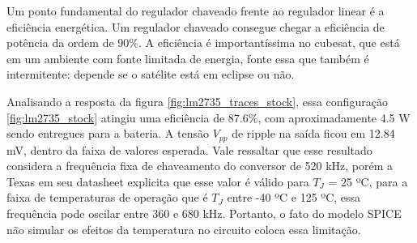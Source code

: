

\noindent
\begin{minipage}{\linewidth}
\label{fig:lm2735_traces_stock}
\end{minipage}

Um ponto fundamental do regulador chaveado frente ao regulador linear é a eficiência energética. Um regulador chaveado consegue chegar a eficiência de potência da ordem de 90\%. A eficiência é importantíssima no cubesat, que está em um ambiente com fonte limitada de energia, fonte essa que também é intermitente: depende se o satélite está em eclipse ou não.

Analisando a resposta da figura \ref{fig:lm2735_traces_stock}, essa configuração \ref{fig:lm2735_stock} atingiu uma eficiência de 87.6\%, 
com aproximadamente 4.5 W sendo entregues para a bateria. 
%
A tensão $V_{pp}$ de ripple na saída ficou em 12.84 mV, dentro da faixa de valores esperada. Vale ressaltar que esse resultado considera a frequência fixa de chaveamento do conversor de 520 kHz, porém a Texas em seu datasheet explicita que esse valor é válido para $T_{J}$ = 25 ºC, para a faixa de temperaturas de operação que é $T_{J}$ entre -40 ºC e 125 ºC, essa frequência pode oscilar entre 360 e 680 kHz. Portanto, o fato do modelo SPICE não simular os efeitos da temperatura no circuito coloca essa limitação.


